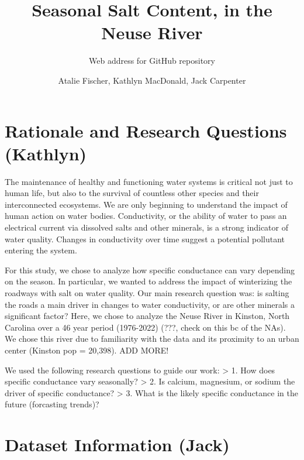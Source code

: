 \documentclass[
  12pt,
]{article}
\title{Seasonal Salt Content, in the Neuse River}
\subtitle{Web address for GitHub repository}
\author{Atalie Fischer, Kathlyn MacDonald, Jack Carpenter}
\date{}
\begin{document}
\maketitle

\newpage
\tableofcontents 
\newpage
\listoftables 
\newpage
\listoffigures 
\newpage

\hypertarget{rationale-and-research-questions-kathlyn}{%
\section{Rationale and Research Questions
(Kathlyn)}\label{rationale-and-research-questions-kathlyn}}

The maintenance of healthy and functioning water systems is critical not
just to human life, but also to the survival of countless other species
and their interconnected ecosystems. We are only beginning to understand
the impact of human action on water bodies. Conductivity, or the ability
of water to pass an electrical current via dissolved salts and other
minerals, is a strong indicator of water quality. Changes in
conductivity over time suggest a potential pollutant entering the
system.

For this study, we chose to analyze how specific conductance can vary
depending on the season. In particular, we wanted to address the impact
of winterizing the roadways with salt on water quality. Our main
research question was: is salting the roads a main driver in changes to
water conductivity, or are other minerals a significant factor? Here, we
chose to analyze the Neuse River in Kinston, North Carolina over a 46
year period (1976-2022) (???, check on this bc of the NAs). We chose
this river due to familiarity with the data and its proximity to an
urban center (Kinston pop = 20,398). ADD MORE!

We used the following research questions to guide our work:
\textgreater{} 1. How does specific conductance vary seasonally?
\textgreater{} 2. Is calcium, magnesium, or sodium the driver of
specific conductance? \textgreater{} 3. What is the likely specific
conductance in the future (forcasting trends)?

\newpage

\hypertarget{dataset-information-jack}{%
\section{Dataset Information (Jack)}\label{dataset-information-jack}}
\end{document}
